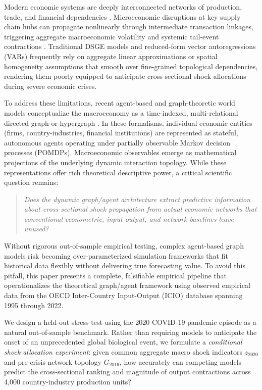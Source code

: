\documentclass[11pt,a4paper]{article}
\begin{document}
Modern economic systems are deeply interconnected networks of production, trade, and financial dependencies \citep{acemoglu2012network, carvalho2019production}. Microeconomic disruptions at key supply chain hubs can propagate nonlinearly through intermediate transaction linkages, triggering aggregate macroeconomic volatility and systemic tail-event contractions \citep{carvalho2021supply}. Traditional DSGE models and reduced-form vector autoregressions (VARs) frequently rely on aggregate linear approximations or spatial homogeneity assumptions that smooth over fine-grained topological dependencies, rendering them poorly equipped to anticipate cross-sectional shock allocations during severe economic crises.

To address these limitations, recent agent-based and graph-theoretic world models conceptualize the macroeconomy as a time-indexed, multi-relational directed graph or hypergraph \citep{worldmodel2026graph}. In these formalisms, individual economic entities (firms, country-industries, financial institutions) are represented as stateful, autonomous agents operating under partially observable Markov decision processes (POMDPs). Macroeconomic observables emerge as mathematical projections of the underlying dynamic interaction topology. While these representations offer rich theoretical descriptive power, a critical scientific question remains:

\begin{quote}
\textit{Does the dynamic graph/agent architecture extract predictive information about cross-sectional shock propagation from actual economic networks that conventional econometric, input-output, and network baselines leave unused?}
\end{quote}

Without rigorous out-of-sample empirical testing, complex agent-based graph models risk becoming over-parameterized simulation frameworks that fit historical data flexibly without delivering true forecasting value. To avoid this pitfall, this paper presents a complete, falsifiable empirical pipeline that operationalizes the theoretical graph/agent framework using observed empirical data from the OECD Inter-Country Input-Output (ICIO) database spanning 1995 through 2022.

We design a held-out stress test using the 2020 COVID-19 pandemic episode as a natural out-of-sample benchmark. Rather than requiring models to anticipate the onset of an unprecedented global biological event, we formulate a \textit{conditional shock allocation experiment}: given common aggregate macro shock indicators $z_{2020}$ and pre-crisis network topology $G_{2019}$, how accurately can competing models predict the cross-sectional ranking and magnitude of output contractions across 4,000 country-industry production units?
\end{document}
